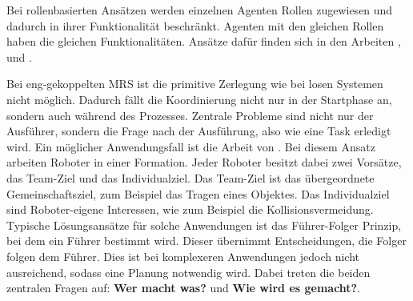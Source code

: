 Bei rollenbasierten Ansätzen werden einzelnen Agenten Rollen zugewiesen und dadurch in ihrer Funktionalität beschränkt. Agenten mit den gleichen Rollen haben die gleichen Funktionalitäten. Ansätze dafür finden sich in den Arbeiten \cite{frias2005exploring}, \cite{vail2003multi} und \cite{stone1999task}.

Bei eng-gekoppelten MRS ist die primitive Zerlegung wie bei losen Systemen nicht möglich. Dadurch fällt die Koordinierung nicht nur in der Startphase an, sondern auch während des Prozesses. Zentrale Probleme sind nicht nur der Ausführer, sondern die Frage nach der Ausführung, also wie eine Task erledigt wird. Ein möglicher Anwendungsfall ist die Arbeit von \cite{saffiotti2000multi}. Bei diesem Ansatz arbeiten Roboter in einer Formation. Jeder Roboter besitzt dabei zwei Vorsätze, das Team-Ziel und das Individualziel. Das Team-Ziel ist das übergeordnete Gemeinschaftsziel, zum Beispiel das Tragen eines Objektes. Das Individualziel sind Roboter-eigene Interessen, wie zum Beispiel die Kollisionsvermeidung. Typische Lösungsansätze für solche Anwendungen ist das Führer-Folger Prinzip, bei dem ein Führer bestimmt wird. Dieser übernimmt Entscheidungen, die Folger folgen dem Führer. Dies ist bei komplexeren Anwendungen jedoch nicht ausreichend, sodass eine Planung notwendig wird. Dabei treten die beiden zentralen Fragen auf:\textbf{ Wer macht was?} und\textbf{ Wie wird es gemacht?}.


